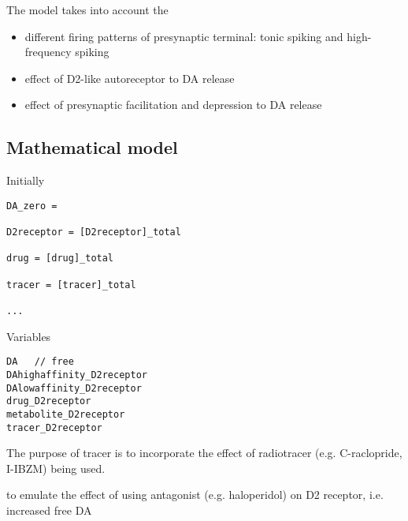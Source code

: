The model takes into account the
\begin{itemize}
  \item different firing patterns of presynaptic terminal: tonic spiking and
  high-frequency spiking
  
  \item effect of D2-like autoreceptor to DA release
  
  \item effect of  presynaptic facilitation and depression to DA release
\end{itemize}

\subsection{Mathematical model}

Initially
\begin{verbatim}
DA_zero = 

D2receptor = [D2receptor]_total  

drug = [drug]_total

tracer = [tracer]_total

...
\end{verbatim}

Variables
\begin{verbatim}
DA   // free
DAhighaffinity_D2receptor
DAlowaffinity_D2receptor
drug_D2receptor
metabolite_D2receptor
tracer_D2receptor

\end{verbatim}

The purpose of tracer is to incorporate the effect of radiotracer (e.g.
C-raclopride, I-IBZM) being used.

to emulate the effect of using antagonist (e.g.
haloperidol) on D2 receptor, i.e. increased free DA 

